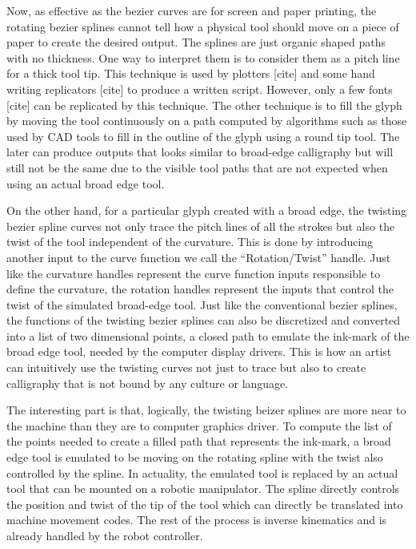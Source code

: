 {    Now, as effective as the bezier curves are for screen and paper printing, the rotating bezier splines cannot tell how a physical tool should move on a piece of paper to create the desired output. The splines are just organic shaped paths with no thickness. One way to interpret them is to consider them as a pitch line for a thick tool tip. This technique is used by plotters [cite] and some hand writing replicators [cite] to produce a written script. However, only a few fonts [cite] can be replicated by this technique. The other technique is to fill the glyph by moving the tool continuously on a path computed by algorithms such as those used by CAD tools to fill in the outline of the glyph using a round tip tool. The later can produce outputs that looks similar to broad-edge calligraphy but will still not be the same due to the visible tool paths that are not expected when using an actual broad edge tool.

    On the other hand, for a particular glyph created with a broad edge, the twisting bezier spline curves not only trace the pitch lines of all the strokes but also the twist of the tool independent of the curvature. This is done by introducing another input to the curve function we call the ``Rotation/Twist'' handle. Just like the curvature handles represent the curve function inputs responsible to define the curvature, the rotation handles represent the inputs that control the twist of the simulated broad-edge tool. Just like the conventional bezier splines, the functions of the twisting bezier splines can also be discretized and converted into a list of two dimensional points, a closed path to emulate the ink-mark of the broad edge tool, needed by the computer display drivers. This is how an artist can intuitively use the twisting curves not just to trace but also to create calligraphy that is not bound by any culture or language.
    
    The interesting part is that, logically, the twisting beizer splines are more near to the machine than they are to computer graphics driver. To compute the list of the points needed to create a filled path that represents the ink-mark, a broad edge tool is emulated to be moving on the rotating spline with the twist also controlled by the spline. In actuality, the emulated tool is replaced by an actual tool that can be mounted on a robotic manipulator. The spline directly controls the position and twist of the tip of the tool which can directly be translated into machine movement codes. The rest of the process is inverse kinematics and is already handled by the robot controller.
    
}
